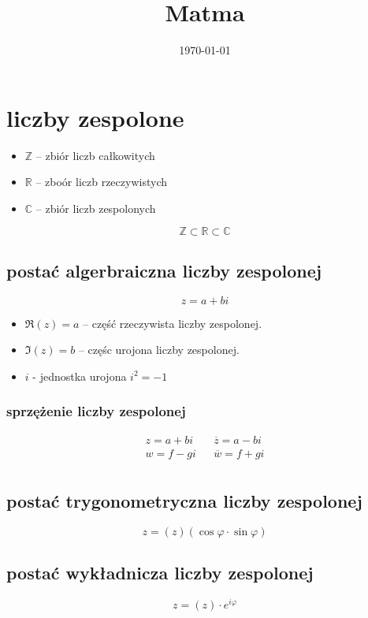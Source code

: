 \documentclass[11pt]{article}
\date{\today}
\title{Matma}
\begin{document}
\maketitle
\tableofcontents


\section{liczby zespolone}
\label{sec:org0f29a95}
\begin{itemize}
\item \(\mathbb{Z}\) -- zbiór liczb całkowitych
\item \(\mathbb{R}\) -- zboór liczb rzeczywistych
\item \(\mathbb{C}\) -- zbiór liczb zespolonych
\end{itemize}
$$\mathbb{Z} \subset \mathbb{R} \subset \mathbb{C}$$
\subsection{postać algerbraiczna liczby zespolonej}
\label{sec:org2fcaeef}
$$z=a+bi$$

\begin{itemize}
\item \(\Re(z) = a\) -- część rzeczywista liczby zespolonej.
\item \(\Im(z) = b\) -- częśc urojona liczby zespolonej.
\item \(i\) - jednostka urojona \(i^2=-1\)
\end{itemize}
\subsubsection{sprzężenie liczby zespolonej}
\label{sec:orgce89dda}
\begin{latex}
\begin{align*}
  z=a+bi && \overline{z}=a-bi \\
  w=f-gi && \overline{w}=f+gi \\
\end{align*}
\end{latex}

\subsection{postać trygonometryczna liczby zespolonej}
\label{sec:orgd0b4ae9}
$$z=(z)(\cos\varphi \cdot \sin\varphi)$$
\subsection{postać wykładnicza liczby zespolonej}
\label{sec:org14e1897}
$$z=(z) \cdot e^{i\varphi}$$
\end{document}
